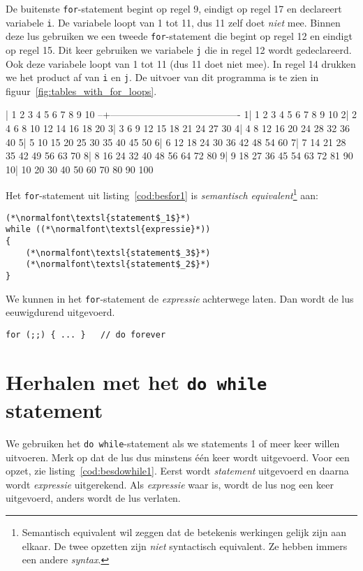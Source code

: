 
De buitenste \texttt{for}-statement begint op regel 9, eindigt op regel 17 en declareert variabele \texttt{i}. De variabele loopt van 1 tot 11, dus 11 zelf doet \textsl{niet} mee. Binnen deze lus gebruiken we een tweede \texttt{for}-statement die begint op regel 12 en eindigt op regel 15. Dit keer gebruiken we variabele \texttt{j} die in regel 12 wordt gedeclareerd. Ook deze variabele loopt van 1 tot 11 (dus 11 doet niet mee). In regel 14 drukken we het product af van \texttt{i} en \texttt{j}. De uitvoer van dit programma is te zien in figuur~\ref{fig:tables_with_for_loops}.

\begin{dosbox}[title=Uitvoer van het programma in listing~\ref{cod:tables_with_for_loops}.,label=fig:tables_with_for_loops]
  |   1   2   3   4   5   6   7   8   9  10
--+----------------------------------------
 1|   1   2   3   4   5   6   7   8   9  10
 2|   2   4   6   8  10  12  14  16  18  20
 3|   3   6   9  12  15  18  21  24  27  30
 4|   4   8  12  16  20  24  28  32  36  40
 5|   5  10  15  20  25  30  35  40  45  50
 6|   6  12  18  24  30  36  42  48  54  60
 7|   7  14  21  28  35  42  49  56  63  70
 8|   8  16  24  32  40  48  56  64  72  80
 9|   9  18  27  36  45  54  63  72  81  90
10|  10  20  30  40  50  60  70  80  90 100
\end{dosbox}

Het \texttt{for}-statement uit listing~\ref{cod:besfor1} is \textsl{semantisch equivalent}\footnote{Semantisch equivalent wil zeggen dat de betekenis werkingen gelijk zijn aan elkaar. De twee opzetten zijn \textsl{niet} syntactisch equivalent. Ze hebben immers een andere \textsl{syntax}.} aan:

\begin{lstlisting}[caption=\texttt{while}-statement als \texttt{for}-statement.,label=cod:besforaswhile]
(*\normalfont\textsl{statement$_1$}*)
while ((*\normalfont\textsl{expressie}*))
{
    (*\normalfont\textsl{statement$_3$}*)
    (*\normalfont\textsl{statement$_2$}*)
}
\end{lstlisting}

We kunnen in het \texttt{for}-statement de \textsl{expressie} achterwege laten. Dan wordt de lus eeuwigdurend uitgevoerd.

\hspace*{1em}\texttt{for (;;) \{ ... \}\ \ \    // do forever}


\section{Herhalen met het \texttt{do while} statement}
We gebruiken het \texttt{do while}-statement als we statements 1 of meer keer willen uitvoeren. Merk op dat de lus dus minstens één keer wordt uitgevoerd. Voor een opzet, zie listing~\ref{cod:besdowhile1}. Eerst wordt \textsl{statement} uitgevoerd en daarna wordt \textsl{expressie} uitgerekend. Als \textsl{expressie} waar is, wordt de lus nog een keer uitgevoerd, anders wordt de lus verlaten.

